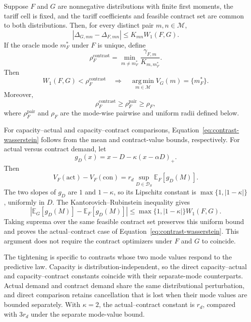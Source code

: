 \documentclass[Times1COL]{WileyNJDv5}
\begin{document}
\begin{proposition}
\label{prop:contrast-wasserstein}
Suppose $F$ and $G$ are nonnegative distributions with finite first
moments, the tariff cell is fixed, and the tariff coefficients and
feasible contract set are common to both distributions. Then, for
every distinct pair $m,n\in\mathcal M$,
\begin{equation}
\label{eq:contrast-wasserstein}
|\Delta_{G,mn}-\Delta_{F,mn}|
\leq K_{mn}W_1(F,G).
\end{equation}
If the oracle mode $m_F^\ast$ under $F$ is unique, define
\begin{equation}
\label{eq:contrast-wasserstein-radius}
\rho_F^{\mathrm{contrast}}
=
\min_{m\neq m_F^\ast}
\frac{\gamma_{F,m}}{K_{m,m_F^\ast}}.
\end{equation}
Then
\begin{equation}
\label{eq:contrast-wasserstein-certificate}
W_1(F,G)<\rho_F^{\mathrm{contrast}}
\quad\Longrightarrow\quad
\operatorname*{arg\,min}_{m\in\mathcal M}V_G(m)
=\{m_F^\ast\}.
\end{equation}
Moreover,
\[
\rho_F^{\mathrm{contrast}}
\geq \rho_F^{\mathrm{pair}}
\geq \rho_F,
\]
where $\rho_F^{\mathrm{pair}}$ and $\rho_F$ are the mode-wise
pairwise and uniform radii defined below.
\end{proposition}

\noindent
For capacity--actual and capacity--contract comparisons,
Equation~\eqref{eq:contrast-wasserstein} follows from the mean and
contract-value bounds, respectively. For actual versus contract
demand, let
\[
g_D(x)=x-D-\kappa(x-\alpha D)_+.
\]
Then
\[
V_F(\mathrm{act})-V_F(\mathrm{con})
=
r_d\sup_{D\in\mathcal D_S}\mathbb{E}_F[g_D(M)].
\]
The two slopes of $g_D$ are $1$ and $1-\kappa$, so its Lipschitz
constant is $\max\{1,|1-\kappa|\}$, uniformly in $D$. The
Kantorovich--Rubinstein inequality gives
\[
\left|\mathbb{E}_G[g_D(M)]-\mathbb{E}_F[g_D(M)]\right|
\leq
\max\{1,|1-\kappa|\}W_1(F,G).
\]
Taking suprema over the same feasible contract set preserves this
uniform bound and proves the actual--contract case of
Equation~\eqref{eq:contrast-wasserstein}. This argument does not
require the contract optimizers under $F$ and $G$ to coincide.

The tightening is specific to contrasts whose two mode values respond
to the predictive law. Capacity is distribution-independent, so the
direct capacity--actual and capacity--contract constants coincide with
their separate-mode counterparts. Actual demand and contract demand
share the same distributional perturbation, and direct comparison
retains cancellation that is lost when their mode values are bounded
separately. With $\kappa=2$, the actual--contract constant is $r_d$,
compared with $3r_d$ under the separate mode-value bound.
\end{document}
